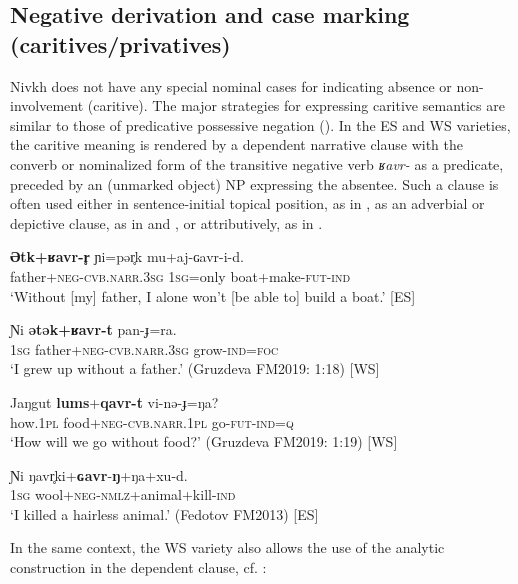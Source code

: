 \documentclass[output=paper,colorlinks,citecolor=brown]{langscibook}
\begin{document}
\subsection{Negative derivation and case marking (caritives/privatives)}\label{sec:niv:3.3}

Nivkh does not have any special nominal cases for indicating absence or non-involvement (caritive). The major strategies for expressing caritive semantics are similar to those of predicative possessive negation (). In the ES and WS varieties, the caritive meaning is rendered by a dependent narrative clause with the converb or nominalized form of the transitive negative verb \textit{ʁavr-} as a predicate, preceded by an (unmarked object) NP expressing the absentee. Such a clause is often used either in sentence-initial topical position, as in , as an adverbial or depictive clause, as in  and , or attributively, as in .


\ea\label{ex:niv:132}
    \gll \textbf{Ətk+ʁavr-r̥} ɲi=pər̥k mu+aj-ɢavr-i-d. \\ 
         father+\textsc{neg-cvb.narr.3sg} \textsc{1sg}=only boat+make-\textsc{fut-ind} \\
    \glt ‘Without [my] father, I alone won’t [be able to] build a boat.’ [ES]
\z

\ea\label{ex:niv:133}
    \gll Ɲi \textbf{ətək+ʁavr-t} pan-ɟ=ra. \\ 
         \textsc{1sg} father+\textsc{neg-cvb.narr.3sg} grow-\textsc{ind=foc} \\
    \glt ‘I grew up without a father.’ (Gruzdeva FM2019: 1:18) [WS]
\z 

\ea\label{ex:niv:134}
    \gll Jaŋgut \textbf{lums}+\textbf{qavr-t} vi-nə{}-ɟ=ŋa? \\ 
         how.\textsc{1pl} food+\textsc{neg-cvb.narr.1pl} go-\textsc{fut-ind=q} \\
    \glt ‘How will we go without food?’ (Gruzdeva FM2019: 1:19) [WS]
\z 

\ea\label{ex:niv:135}
    \gll Ɲi ŋavr̥ki+\textbf{ɢavr}-\textbf{ŋ}+ŋa+xu-d. \\ 
         \textsc{1sg} wool+\textsc{neg-nmlz}+animal+kill-\textsc{ind} \\
    \glt ‘I killed a hairless animal.’ (Fedotov FM2013) [ES]
\z 

In the same context, the WS variety also allows the use of the analytic construction in the dependent clause, cf. :
\end{document}
